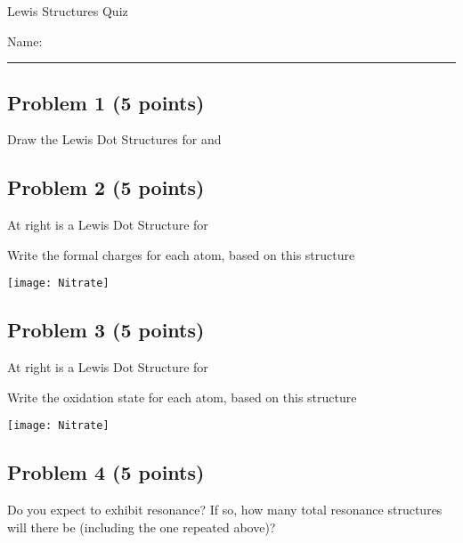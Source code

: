 \documentclass[12pt, letterpaper]{memoir}
\begin{document}
	\begin{center}
		{\large	Lewis Structures Quiz}
	\end{center}
	{\large Name: \rule[-1mm]{4in}{.1pt}}
	\subsection*{Problem 1 (5 points)}
	Draw the Lewis Dot Structures for  and 
	
	\vspace{10em}
	
	\subsection*{Problem 2  (5 points)}	
	\begin{minipage}[b]{0.5\linewidth}
		At right is a Lewis Dot Structure for  
		
		\noindent Write the formal charges for each atom, based on this structure
		
	\end{minipage}
	\begin{minipage}{0.5\linewidth}
		\texttt{[image: Nitrate]}
	\end{minipage}
	
	\vspace{1em}
	\subsection*{Problem 3 (5 points)}
	\begin{minipage}[b]{0.5\linewidth}
		At right is a Lewis Dot Structure for  
		
		\noindent Write the oxidation state for each atom, based on this structure
		
	\end{minipage}
	\begin{minipage}{0.5\linewidth}
		\texttt{[image: Nitrate]}
	\end{minipage}
	
	\vspace{1em}
	\subsection*{Problem 4 (5 points)}
	Do you expect  to exhibit resonance? If so, how many total resonance structures will there be (including the one repeated above)?
	
	
\end{document}
